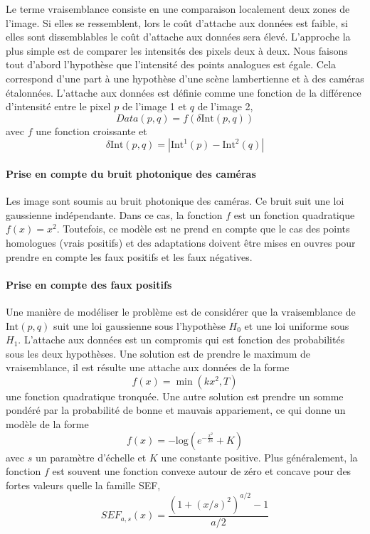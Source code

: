 \documentclass[../main/These_Mathias_Paget.tex]{subfiles}
\begin{document}
Le terme vraisemblance consiste en une comparaison localement deux zones de l'image. Si elles se ressemblent, lors le coût d'attache aux données est faible, si elles sont dissemblables le coût d'attache aux données sera élevé. L'approche la plus simple est de comparer les intensités des pixels deux à deux. Nous faisons tout d'abord l'hypothèse que l'intensité des points analogues est égale. Cela correspond d'une part à une hypothèse d'une scène lambertienne et à des caméras étalonnées.  L'attache aux données est définie comme une fonction de la différence d’intensité entre le pixel $p$ de l'image 1 et $q$ de l'image 2,
\begin{equation}
Data(p,q) = f(\delta \text{Int}(p,q))
\end{equation}
avec  $f$ une fonction croissante et
\begin{equation}
\delta \text{Int}(p,q) = | \text{Int}^1(p) - \text{Int}^2(q) |
\end{equation}

\paragraph*{Prise en compte du bruit photonique des caméras}
Les image sont soumis au bruit photonique des caméras. Ce bruit suit une loi gaussienne indépendante. Dans ce cas, la fonction $f$ est un fonction quadratique $f(x)=x^2$. Toutefois, ce modèle est ne prend en compte que le cas des points homologues (vrais positifs) et des adaptations doivent être mises en ouvres pour prendre en compte les faux positifs et les faux négatives.

\paragraph*{Prise en compte des faux positifs}
Une manière de modéliser le problème est de considérer que la vraisemblance de $\text{Int}(p,q)$ suit une loi gaussienne sous l'hypothèse $H_0$ et une loi uniforme sous $H_1$. L'attache aux données est un compromis qui est fonction des probabilités sous les deux hypothèses. Une solution est de prendre le maximum de vraisemblance, il est résulte une attache aux données de la forme
\begin{equation}
f(x) = \min(kx^2,T)
\end{equation}
une fonction quadratique tronquée. Une autre solution est prendre un somme pondéré par la probabilité de bonne et mauvais appariement, ce qui donne un modèle de la forme
\begin{equation}
f(x) = -\text{log}(e^{-\frac{x^2}{2s}}+K)
\end{equation}
avec $s$ un paramètre d’échelle et $K$ une constante positive. Plus généralement, la fonction $f$ est souvent une fonction convexe autour de zéro et concave pour des fortes valeurs quelle la famille SEF,
\begin{equation}
SEF_{a,s}(x) =  \frac{ \left( 1+(x/s)^2 \right)^{a/2} - 1}{a/2}
\label{eq:def_SEF}
\end{equation}
\end{document}
